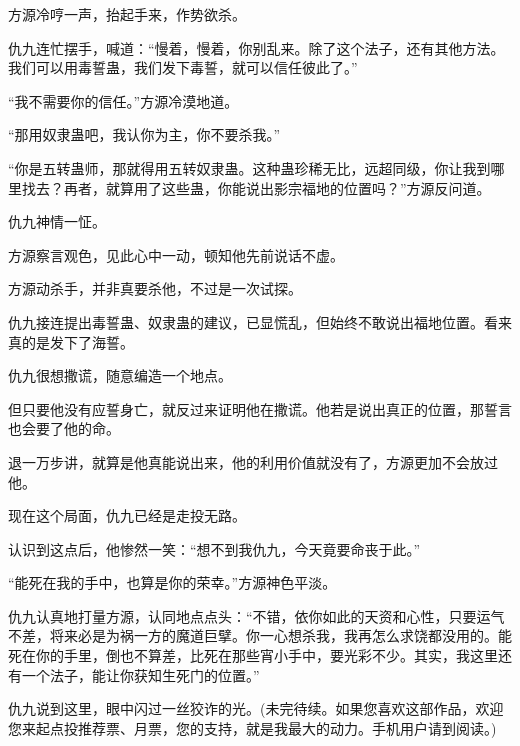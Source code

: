 \begin{this_body}
方源冷哼一声，抬起手来，作势欲杀。

仇九连忙摆手，喊道：“慢着，慢着，你别乱来。除了这个法子，还有其他方法。我们可以用毒誓蛊，我们发下毒誓，就可以信任彼此了。”

“我不需要你的信任。”方源冷漠地道。

“那用奴隶蛊吧，我认你为主，你不要杀我。”

“你是五转蛊师，那就得用五转奴隶蛊。这种蛊珍稀无比，远超同级，你让我到哪里找去？再者，就算用了这些蛊，你能说出影宗福地的位置吗？”方源反问道。

仇九神情一怔。

方源察言观色，见此心中一动，顿知他先前说话不虚。

方源动杀手，并非真要杀他，不过是一次试探。

仇九接连提出毒誓蛊、奴隶蛊的建议，已显慌乱，但始终不敢说出福地位置。看来真的是发下了海誓。

仇九很想撒谎，随意编造一个地点。

但只要他没有应誓身亡，就反过来证明他在撒谎。他若是说出真正的位置，那誓言也会要了他的命。

退一万步讲，就算是他真能说出来，他的利用价值就没有了，方源更加不会放过他。

现在这个局面，仇九已经是走投无路。

认识到这点后，他惨然一笑：“想不到我仇九，今天竟要命丧于此。”

“能死在我的手中，也算是你的荣幸。”方源神色平淡。

仇九认真地打量方源，认同地点点头：“不错，依你如此的天资和心性，只要运气不差，将来必是为祸一方的魔道巨擘。你一心想杀我，我再怎么求饶都没用的。能死在你的手里，倒也不算差，比死在那些宵小手中，要光彩不少。其实，我这里还有一个法子，能让你获知生死门的位置。”

仇九说到这里，眼中闪过一丝狡诈的光。(未完待续。如果您喜欢这部作品，欢迎您来起点投推荐票、月票，您的支持，就是我最大的动力。手机用户请到阅读。)

\end{this_body}

